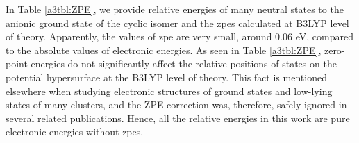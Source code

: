 \begin{refsection}
In Table \ref{a3tbl:ZPE}, we provide relative energies of many neutral states to the anionic ground state of the cyclic isomer and the \acrshort{zpe}s calculated at B3LYP level of theory. Apparently, the values of \acrshort{zpe} are very small, around 0.06 eV, compared to the absolute values of electronic energies. As seen in Table \ref{a3tbl:ZPE}, zero-point energies do not significantly affect the relative positions of states on the potential hypersurface at the B3LYP level of theory. This fact is mentioned elsewhere \cite{a3:1} when studying electronic structures of ground states and low-lying states of many clusters, and the ZPE correction was, therefore, safely ignored in several related publications. \cite{a3:2, a3:3, a3:4, a3:5, a3:6} Hence, all the relative energies in this work are pure electronic energies without \acrshort{zpe}s.





\end{refsection}

